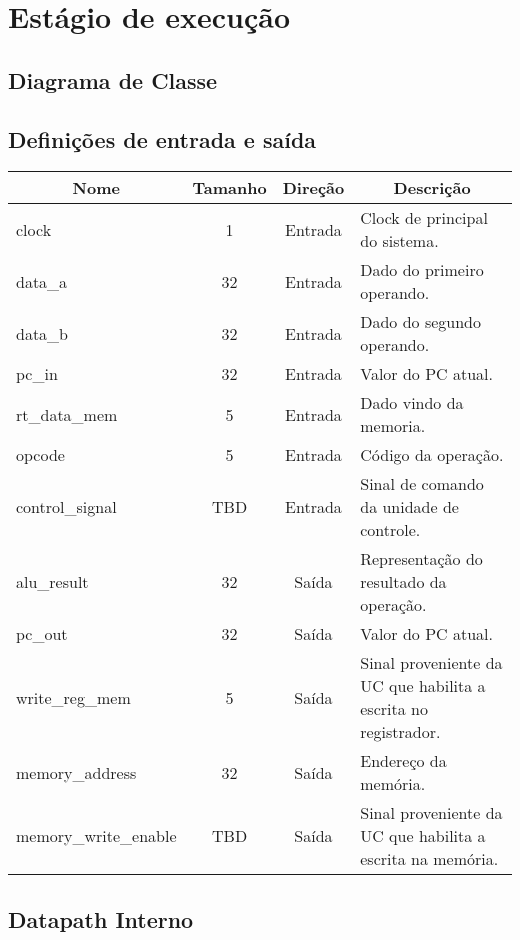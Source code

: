 \section{Estágio de execução}
	\subsection{Diagrama de Classe}
  \begin{figure}[h]
    
  \end{figure}
		
		\subsection{Definições de entrada e saída}
		
	\begin{center}
		\begin{longtable}[pos]{| l | c | c | m{7cm} |} \hline
			\multicolumn{1}{|c|}{\cellcolor[gray]{0.9}\textbf{Nome}} & 
			\multicolumn{1}{c|}{\cellcolor[gray]{0.9}\textbf{Tamanho}} & 
			\multicolumn{1}{c|}{\cellcolor[gray]{0.9}\textbf{Direção}} &
			\multicolumn{1}{c|}{\cellcolor[gray]{0.9}\textbf{Descrição}} \\ \hline
			\endhead
			\hline
			\endlastfoot
			
			clock & 1 & Entrada & Clock de principal do sistema.\\ \hline
			data_a & 32 & Entrada & Dado do primeiro operando. \\ \hline
			data_b & 32 & Entrada & Dado do segundo operando. \\ \hline
			pc_in & 32 & Entrada & Valor do PC atual. \\ \hline
			rt_data_mem & 5 & Entrada & Dado vindo da memoria. \\ \hline
			opcode & 5 & Entrada & Código da operação.\\ \hline
			control_signal & TBD & Entrada & Sinal de comando da unidade de controle. \\ \hline
			alu_result & 32 & Saída & Representação do resultado da operação. \\ \hline
			pc_out & 32 & Saída & Valor do PC atual. \\ \hline
			write_reg_mem & 5 & Saída & Sinal proveniente da UC que habilita a escrita no registrador. \\ \hline
			memory_address & 32 & Saída & Endereço da memória. \\ \hline
			memory_write_enable & TBD & Saída & Sinal proveniente da UC que habilita a escrita na memória.
			
		\end{longtable}
	\end{center}
	
	\subsection{Datapath Interno}
	
